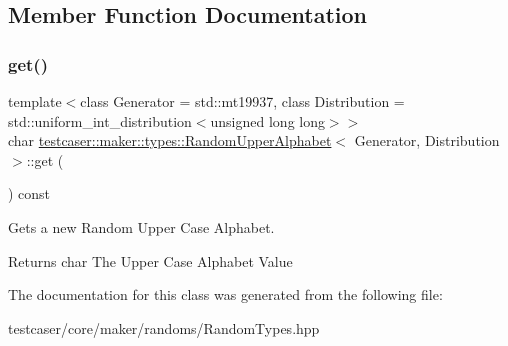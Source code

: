 \subsection{Member Function Documentation}
\mbox{\label{classtestcaser_1_1maker_1_1types_1_1RandomUpperAlphabet_a682af9423088caffe8619113b6a6c1b0}} 
\subsubsection{\texorpdfstring{get()}{get()}}
{\footnotesize\ttfamily template$<$class Generator = std\+::mt19937, class Distribution = std\+::uniform\+\_\+int\+\_\+distribution$<$unsigned long long$>$$>$ \\
char \mbox{\hyperlink{classtestcaser_1_1maker_1_1types_1_1RandomUpperAlphabet}{testcaser\+::maker\+::types\+::\+Random\+Upper\+Alphabet}}$<$ Generator, Distribution $>$\+::get (\begin{DoxyParamCaption}{ }\end{DoxyParamCaption}) const\hspace{0.3cm}{\ttfamily [inline]}}



Gets a new Random Upper Case Alphabet. 

\begin{DoxyReturn}{Returns}
char The Upper Case Alphabet Value 
\end{DoxyReturn}


The documentation for this class was generated from the following file\+:\begin{DoxyCompactItemize}
\item 
testcaser/core/maker/randoms/Random\+Types.\+hpp\end{DoxyCompactItemize}
